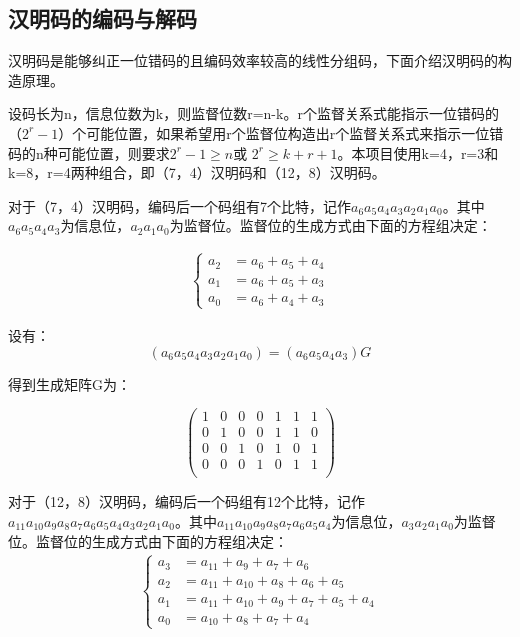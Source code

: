 \documentclass[UTF8]{ctexart}
\begin{document}
\subsection{汉明码的编码与解码}
\label{para.3.4}

汉明码是能够纠正一位错码的且编码效率较高的线性分组码，下面介绍汉明码的构造原理。

设码长为n，信息位数为k，则监督位数r=n-k。r个监督关系式能指示一位错码的（$2^r-1$）个可能位置，如果希望用r个监督位构造出r个监督关系式来指示一位错码的n种可能位置，则要求$ 2^r-1\geq n $或 $ 2^r\geq k+r+1$。本项目使用k=4，r=3和k=8，r=4两种组合，即（7，4）汉明码和（12，8）汉明码。

对于（7，4）汉明码，编码后一个码组有7个比特，记作$a_6 a_5 a_4 a_3 a_2 a_1 a_0$。其中$a_6 a_5 a_4 a_3$为信息位，$a_2 a_1 a_0$为监督位。监督位的生成方式由下面的方程组决定：

\begin{align*}
    \left\{     
        \begin{aligned}
        a_2&=a_6+a_5+a_4 \\
        a_1&=a_6+a_5+a_3 \\
        a_0&=a_6+a_4+a_3 
        \end{aligned}
    \right.
\end{align*}

设有：
$$(a_6 a_5 a_4 a_3 a_2 a_1 a_0)=(a_6 a_5 a_4 a_3)G$$

得到生成矩阵G为：

\begin{equation*}
    \begin{pmatrix}
        1 & 0 & 0 & 0 & 1 & 1 & 1 \\
        0 & 1 & 0 & 0 & 1 & 1 & 0 \\
        0 & 0 & 1 & 0 & 1 & 0 & 1 \\
        0 & 0 & 0 & 1 & 0 & 1 & 1 \\
    \end{pmatrix}
\end{equation*}

对于（12，8）汉明码，编码后一个码组有12个比特，记作$a_{11} a_{10} a_9 a_8 a_7 a_6 a_5 a_4 a_3 a_2 a_1 a_0$。其中$a_11 a_10 a_9 a_8 a_7 a_6 a_5 a_4$为信息位，$a_3 a_2 a_1 a_0$为监督位。监督位的生成方式由下面的方程组决定：
\begin{align*}
    \left\{     
        \begin{aligned}
        a_3&=a_{11}+a_9+a_7+a_6 \\
        a_2&=a_{11}+a_{10}+a_8+a_6+a_5\\
        a_1&=a_{11}+a_{10}+a_9+a_7+a_5+a_4 \\
        a_0&=a_{10}+a_8+a_7+a_4
        \end{aligned}
    \right.
\end{align*}
\end{document}

